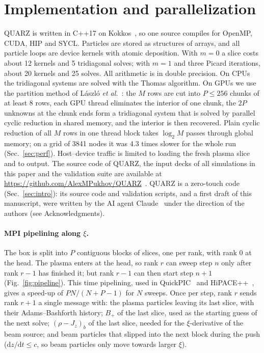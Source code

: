 \documentclass[aps,prab,reprint,floatfix,superscriptaddress,amsmath,amssymb]{revtex4-2}
\newcommand{\dd}{\mathrm{d}}
\begin{document}
\section{Implementation and parallelization}\label{sec:impl}

QUARZ is written in C++17 on Kokkos~\cite{Trott2022}, so one source compiles for OpenMP, CUDA, HIP and SYCL. Particles are stored as structures of arrays, and all particle loops are device kernels with atomic deposition. With $m=0$ a slice costs about 12 kernels and 5 tridiagonal solves; with $m=1$ and three Picard iterations, about 20 kernels and 25 solves. All arithmetic is in double precision. On CPUs the tridiagonal systems are solved with the Thomas algorithm. On GPUs we use the partition method of L\'aszl\'o \textit{et al.}~\cite{Laszlo2016}: the $M$ rows are cut into $P\le 256$ chunks of at least 8 rows, each GPU thread eliminates the interior of one chunk, the $2P$ unknowns at the chunk ends form a tridiagonal system that is solved by parallel cyclic reduction in shared memory, and the interior is then recovered. Plain cyclic reduction of all $M$ rows in one thread block takes $\log_2 M$ passes through global memory; on a grid of 3841 nodes it was 4.3 times slower for the whole run (Sec.~\ref{sec:perf}). Host--device traffic is limited to loading the fresh plasma slice and to output. The source code of QUARZ, the input decks of all simulations in this paper and the validation suite are available at \url{https://github.com/AlexMPukhov/QUARZ}~\cite{QUARZ}. QUARZ is a zero-touch code (Sec.~\ref{sec:intro}): its source code and validation scripts, and a first draft of this manuscript, were written by the AI agent Claude~\cite{Claude} under the direction of the authors (see Acknowledgments).

\paragraph{MPI pipelining along $\xi$.} The box is split into $P$ contiguous blocks of slices, one per rank, with rank 0 at the head. The plasma enters at the head, so rank $r$ can sweep step $n$ only after rank $r-1$ has finished it; but rank $r-1$ can then start step $n+1$ (Fig.~\ref{fig:pipeline}). This time pipelining, used in QuickPIC~\cite{Feng2009} and HiPACE++~\cite{Diederichs2022}, gives a speed-up of $PN/(N+P-1)$ for $N$ sweeps. Once per step, rank $r$ sends rank $r+1$ a single message with: the plasma particles leaving its last slice, with their Adams--Bashforth history; $B_+$ of the last slice, used as the starting guess of the next solve; $(\rho - J_z)_b$ of the last slice, needed for the $\xi$-derivative of the beam source; and beam particles that slipped into the next block during the push ($\dd z/\dd t\le c$, so beam particles only move towards larger $\xi$).
\end{document}

